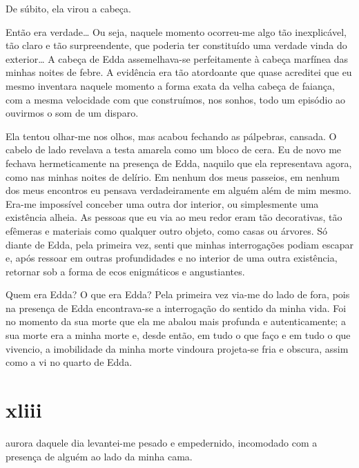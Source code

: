 De súbito, ela virou a cabeça.

Então era verdade\ldots{} Ou seja, naquele momento ocorreu-me algo tão
inexplicável, tão claro e tão surpreendente, que poderia ter constituído uma
verdade vinda do exterior\ldots{} A cabeça de Edda assemelhava-se
perfeitamente à cabeça marfínea das minhas noites de febre. A evidência era
tão atordoante que quase acreditei que eu mesmo inventara naquele momento a
forma exata da velha cabeça de faiança, com a mesma velocidade com que
construímos, nos sonhos, todo um episódio ao ouvirmos o som de um disparo.  


Ela tentou olhar-me nos olhos, mas acabou fechando as pálpebras, cansada. O
cabelo de lado revelava a testa amarela como um bloco de cera. Eu de novo me
fechava hermeticamente na presença de Edda, naquilo que ela representava
agora, como nas minhas noites de delírio. Em nenhum dos meus passeios, em
nenhum dos meus encontros eu pensava verdadeiramente em alguém além de mim
mesmo. Era-me impossível conceber uma outra dor interior, ou simplesmente uma
existência alheia. As pessoas que eu via ao meu redor eram tão decorativas,
tão efêmeras e materiais como qualquer outro objeto, como casas ou árvores.
Só diante de Edda, pela primeira vez, senti que minhas interrogações podiam
escapar e, após ressoar em outras profundidades e no interior de uma outra
existência, retornar sob a forma de ecos enigmáticos e angustiantes.

Quem era Edda? O que era Edda? Pela primeira vez via-me do lado de fora, pois
na presença de Edda encontrava-se a interrogação do sentido da minha vida.
Foi no momento da sua morte que ela me abalou mais profunda e autenticamente;
a sua morte era a minha morte e, desde então, em tudo o que faço e em tudo o
que vivencio, a imobilidade da minha morte vindoura projeta-se fria e
obscura, assim como a vi no quarto de Edda.


\section{xliii} 

 aurora daquele dia levantei-me pesado e empedernido, incomodado
 com a presença de alguém ao lado da minha cama.

